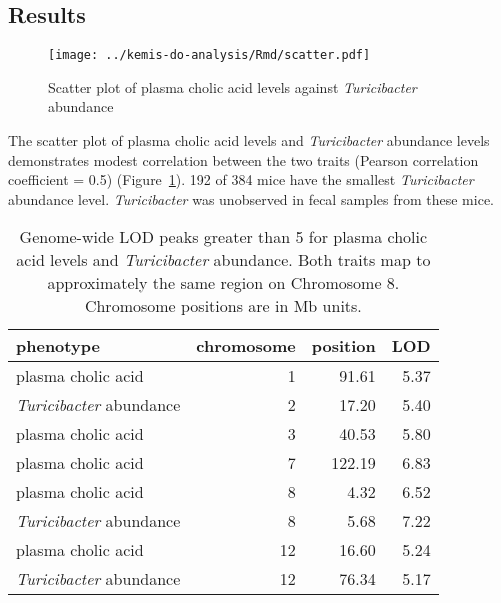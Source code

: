 \documentclass[oneside]{book}
\begin{document}
\subsection{Results}


\begin{figure}
\texttt{[image: ../kemis-do-analysis/Rmd/scatter.pdf]}
\caption{Scatter plot of plasma cholic acid levels against \emph{Turicibacter} abundance}\label{fig:3c-scatter}
\end{figure}

The scatter plot of plasma cholic acid levels and \emph{Turicibacter} abundance levels demonstrates modest correlation between the two traits (Pearson correlation coefficient = 0.5) (Figure~\ref{fig:3c-scatter}). 192 of 384 mice have the smallest \emph{Turicibacter} abundance level. \emph{Turicibacter} was unobserved in fecal samples from these mice.




\begin{table}[ht]
\centering
\begin{tabular}{lrrr}
  \hline
phenotype & chromosome & position & LOD \\ 
  \hline
plasma cholic acid &   1 & 91.61 & 5.37 \\ 
 \emph{Turicibacter} abundance &   2 & 17.20 & 5.40 \\ 
  plasma cholic acid &   3 & 40.53 & 5.80 \\ 
  plasma cholic acid &   7 & 122.19 & 6.83 \\ 
  plasma cholic acid &   8 & 4.32 & 6.52 \\ 
 \emph{Turicibacter} abundance &   8 & 5.68 & 7.22 \\ 
  plasma cholic acid &  12 & 16.60 & 5.24 \\ 
 \emph{Turicibacter} abundance &  12 & 76.34 & 5.17 \\ 
   \hline
\end{tabular}
\caption{\label{tab:3c-lod-peaks}Genome-wide LOD peaks greater than 5 for plasma cholic acid levels and \emph{Turicibacter} abundance. Both traits map to approximately the same region on Chromosome 8. Chromosome positions are in Mb units.}
\end{table}
\end{document}
